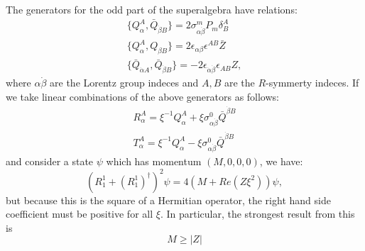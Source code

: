 \begin{example}[$d=4$,$\mathcal{N}=2$]
The generators for the odd part of the superalgebra have relations:
\begin{gather}
  \{Q_\alpha^A,\bar{Q}_{\dot{\beta}B}\} = 2\sigma^m_{\alpha\dot{\beta}}P_m\delta^A_B \\
  \{Q_\alpha^A,Q_{\beta B}\} = 2\epsilon_{\alpha\beta}\epsilon^{AB}\bar{Z}\\
  \{\bar{Q}_{\dot{\alpha}A},\bar{Q}_{\dot{\beta}B}\}
  = -2\epsilon_{\dot{\alpha}\dot{\beta}}\epsilon_{AB}Z,
\end{gather}
where $\alpha\dot{\beta}$ are the Lorentz group indeces and $A,B$ are the
$R$-symmerty indeces.
If we take linear combinations of the above generators as follows:
\begin{gather}
  R_\alpha^A = \xi^{-1}Q_\alpha^A
  + \xi\sigma^0_{\alpha\dot{\beta}}\bar{Q}^{\dot{\beta}B}\\
  T_\alpha^A = \xi^{-1}Q_\alpha^A - \xi\sigma^0_{\alpha\dot{\beta}}\bar{Q}^{\dot{\beta}B}
\end{gather}
and consider a state $\psi$ which has momentum $(M,0,0,0)$, we have:
\begin{equation}
  \left(R_1^1+(R_1^1)^\dagger\right)^2\psi = 4(M+Re(Z\xi^2))\psi,
\end{equation}
but because this is the square of a Hermitian operator, the right hand side
coefficient must be positive for all $\xi$. In particular, the strongest result from this is
\begin{equation}
  M\geq|Z|
\end{equation}
\end{example}
